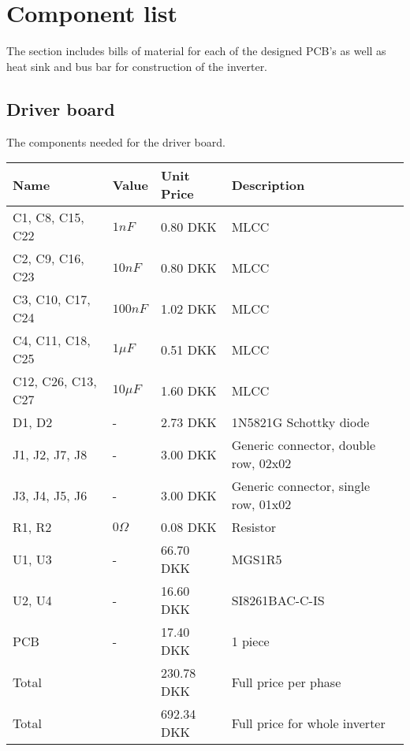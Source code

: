 \section{Component list}
\label{app:component_list}
The section includes bills of material for each of the designed PCB's as well as heat sink and bus bar for construction of the inverter.



\subsection{Driver board}
The components needed for the driver board.
\begin{table}[H]
\centering
\footnotesize
\begin{tabular}{|p{4cm} p{1.5cm} p{2.2cm} p{6cm}|} \hline
\textbf{Name}     & \textbf{Value} & \textbf{Unit Price} & \textbf{Description}  \\ \hline
C1, C8, C15, C22  & $1nF$       & 0.80 DKK & MLCC \\
C2, C9, C16, C23  & $10nF$       & 0.80 DKK & MLCC \\
C3, C10, C17, C24 & $100nF$     & 1.02 DKK & MLCC \\
C4, C11, C18, C25 & $1\mu F$    & 0.51 DKK & MLCC \\
C12, C26, C13, C27 & $10\mu F$   & 1.60 DKK & MLCC \\
D1, D2            & -           & 2.73 DKK & 1N5821G Schottky diode \\
J1, J2, J7, J8    & -           & 3.00 DKK & Generic connector, double row, 02x02 \\
J3, J4, J5, J6    & -           & 3.00 DKK & Generic connector, single row, 01x02 \\
R1, R2            & $0 \Omega$   & 0.08 DKK & Resistor                             \\
U1, U3            & -           & 66.70 DKK & MGS1R5                               \\
U2, U4            & -           & 16.60 DKK & SI8261BAC-C-IS \\       
PCB               & -                  & 17.40 DKK     & 1 piece \\ \hline
Total && 230.78 DKK & Full price per phase \\ \hline
Total && 692.34 DKK & Full price for whole inverter \\ \hline
\end{tabular}
\end{table}


